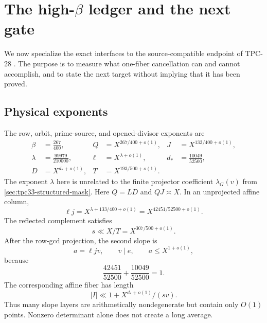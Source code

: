 \section{The high-\texorpdfstring{\(\beta\)}{beta} ledger and the next gate}
\label{sec:tpc33-high-beta-next-gate}

We now specialize the exact interfaces to the source-compatible endpoint
of TPC-28 \citep{WangTPC28}.  The purpose is to measure what one-fiber cancellation can and
cannot accomplish, and to state the next target without implying that it
has been proved.

\subsection{Physical exponents}

The row, orbit, prime-source, and opened-divisor exponents are
\begin{align}
 \beta&=\frac{267}{400},
 &Q&=X^{267/400+o(1)},
 &J&=X^{133/400+o(1)},
 \label{eq:tpc33-high-QJ}\\
 \lambda&=\frac{99979}{210000},
 &\ell&=X^{\lambda+o(1)},
 &d_*&=\frac{10049}{52500},
 \label{eq:tpc33-high-LD}\\
 D&=X^{d_*+o(1)},
 &T&=X^{193/500+o(1)}.
 \label{eq:tpc33-high-DT}
\end{align}
The exponent \(\lambda\) here is unrelated to the finite projector
coefficient \(\lambda_G(v)\) from
\cref{sec:tpc33-structured-mask}.
Here \(Q=LD\) and \(QJ\asymp X\).  In an unprojected affine column,
\begin{equation}
 \ell j
 =X^{\lambda+133/400+o(1)}
 =X^{42451/52500+o(1)}.
 \label{eq:tpc33-high-ellj}
\end{equation}
The reflected complement satisfies
\begin{equation}
 s\ll X/T=X^{307/500+o(1)}.
 \label{eq:tpc33-high-s-range}
\end{equation}
After the row-gcd projection, the second slope is
\begin{equation}
 a=\ell jv,\qquad v\mid e,\qquad
 a\le X^{1+o(1)},
 \label{eq:tpc33-high-projected-slope}
\end{equation}
because
\begin{equation}
 \frac{42451}{52500}+\frac{10049}{52500}=1.
 \label{eq:tpc33-high-slope-sum}
\end{equation}
The corresponding affine fiber has length
\begin{equation}
 |I|\ll1+X^{d_*+o(1)}/(sv).
 \label{eq:tpc33-high-fiber-length}
\end{equation}
Thus many slope layers are arithmetically nondegenerate but contain only
\(O(1)\) points.  Nonzero determinant alone does not create a long average.

